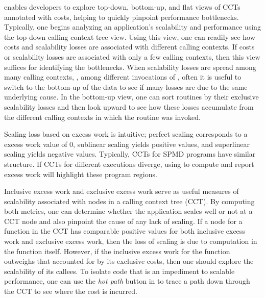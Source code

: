 \documentclass[11pt,letterpaper]{report}
\begin{document}
\hpcviewer{} enables developers to explore top-down, bottom-up, and flat views of CCTs annotated with costs, helping to quickly pinpoint performance bottlenecks.
Typically, one begins analyzing an application's scalability and performance using the top-down calling context tree view.
Using this view, one can readily see how costs and scalability losses are associated with different calling contexts.
If costs or scalability losses are associated with only a few calling contexts, then this view suffices for identifying the bottlenecks.
When scalability losses are spread among many calling contexts, \eg, among different invocations of , often it is useful to switch to the bottom-up of the data to see if many losses are due to the same underlying cause.
In the bottom-up view, one can sort routines by their exclusive scalability losses and then look upward to see how these losses accumulate from the different calling contexts in which the routine was invoked.

Scaling loss based on excess work is intuitive; perfect scaling corresponds to a excess work value of $0$, sublinear scaling yields positive values, and superlinear scaling yields negative values.
Typically, CCTs for SPMD programs have similar structure.
If CCTs for different executions diverge, using \hpcviewer{} to compute and report excess work will highlight these program regions.

Inclusive excess work and exclusive excess work serve as useful measures of scalability associated with nodes in a calling context tree (CCT).
By computing both metrics, one can determine whether the application scales well or not at a CCT node and also pinpoint the cause of any lack of scaling.
If a node for a function in the CCT has comparable positive values for both inclusive excess work and exclusive excess work, then the loss of scaling is due to computation in the function itself.
However, if the inclusive excess work for the function outweighs that accounted for by its exclusive costs, then one should explore the scalability of its callees.
To isolate code that is an impediment to scalable performance, one can use the {\em hot path} button in \hpcviewer{} to trace a path down through the CCT to see where the cost is incurred.



\end{document}
